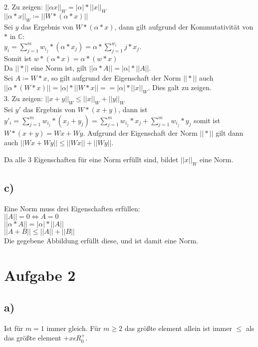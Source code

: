 \documentclass[10pt,a4paper]{article}
\begin{document}
2. Zu zeigen: $||\alpha x||_W = |\alpha|*||x||_W$\\

$||\alpha*x||_W \coloneqq || W * ( \alpha * x )||$\\
Sei $y$ das Ergebnis von $W*(\alpha * x)$, dann gilt aufgrund der Kommutativität von $*$ in $\mathbb{C}$:\\ 
$y_i = \sum_{j=1}^m w_i_j * (\alpha * x_j) = \alpha*\sum_{j=1}^{w_i}j*x_j$.\\ 
Somit ist $w*(\alpha * x) = \alpha *(w*x)$\\

Da $||*||$ eine Norm ist, gilt $||\alpha*A|| = |\alpha|*||A||$.\\
Sei $A\coloneqq W*x$, so gilt aufgrund der Eigenschaft der Norm $||*||$ auch $||\alpha*(W*x)|| = |\alpha|*||W*x|| =  = |\alpha|*||x||_W$. Dies galt zu zeigen.\\

3. Zu zeigen: $||x+y||_W \leq ||x||_W +||y||_W$\\

Sei $y'$ das Ergebnis von $W*(x+y)$, dann ist $y'_i = \sum_{j=1}^m w_i_j * ( x_j + y_j ) = \sum_{j=1}^m w_i_j * x_j + \sum_{j=1}^m w_i_j * y_j$ somit ist $W*(x+y) = Wx + Wy$. Aufgrund der Eigenschaft der Norm $||*||$ gilt dann auch $||Wx + Wy|| \leq ||Wx|| + ||Wy||$.

Da alle 3 Eigenschaften für eine Norm erfüllt sind, bildet $||x||_W$ eine Norm.

\subsection*{c)}
Eine Norm muss drei Eigenschaften erfüllen:\\
$||A|| = 0 \Leftrightarrow A = 0$\\
$||\alpha*A|| = |\alpha|*||A||$\\
$||A+B|| \leq ||A|| + ||B||$\\
Die gegebene Abbildung erfüllt diese, und ist damit eine Norm.

\section*{Aufgabe 2}
\subsection*{a)}
Ist für $m=1$ immer gleich.
Für $m \geq 2$ das größte element allein ist immer $\leq$ als das größte element $+ x\epsilon R_0^+$.
\end{document}
